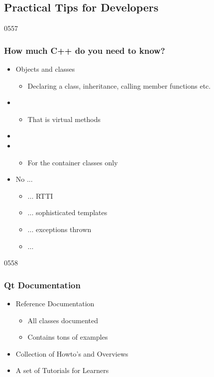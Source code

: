 \subsection{Practical Tips for Developers}

\begin{slide}{0557}
  \frametitle{How much C++ do you need to know?} \label{cpp_needed}
  \begin{itemize}
  \item Objects and classes
    \begin{itemize}
    \item Declaring a class, inheritance, calling member functions etc.
    \end{itemize}
  \item {}
    \begin{itemize}
    \item That is virtual methods
    \end{itemize}
  \item {}
  \item {}
    \begin{itemize}
    \item For the container classes only
    \end{itemize}
  \item No ...
    \begin{itemize}
    \item ... RTTI
    \item ... sophisticated templates
    \item ... exceptions thrown
    \item ...
    \end{itemize}

  \end{itemize}
\end{slide}

\begin{slide}{0558} \frametitle{Qt Documentation} 
  \begin{itemize}
    \item Reference Documentation
    \begin{itemize}
      \item All classes documented
      \item Contains tons of examples
    \end{itemize}
    \item Collection of Howto's and Overviews
    \item A set of Tutorials for Learners
  \end{itemize}
  \vspace{5mm}
\end{slide}

